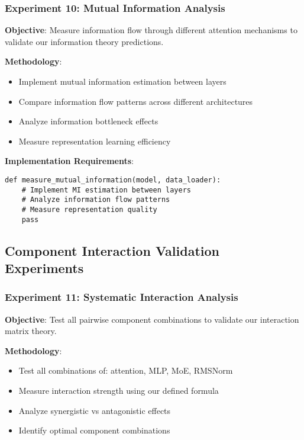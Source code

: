 \documentclass[11pt,a4paper]{article}
\begin{document}
\subsubsection{Experiment 10: Mutual Information Analysis}
\textbf{Objective}: Measure information flow through different attention mechanisms to validate our information theory predictions.

\textbf{Methodology}:
\begin{itemize}
    \item Implement mutual information estimation between layers
    \item Compare information flow patterns across different architectures
    \item Analyze information bottleneck effects
    \item Measure representation learning efficiency
\end{itemize}

\textbf{Implementation Requirements}:
\begin{verbatim}
def measure_mutual_information(model, data_loader):
    # Implement MI estimation between layers
    # Analyze information flow patterns
    # Measure representation quality
    pass
\end{verbatim}

\subsection{Component Interaction Validation Experiments}

\subsubsection{Experiment 11: Systematic Interaction Analysis}
\textbf{Objective}: Test all pairwise component combinations to validate our interaction matrix theory.

\textbf{Methodology}:
\begin{itemize}
    \item Test all combinations of: attention, MLP, MoE, RMSNorm
    \item Measure interaction strength using our defined formula
    \item Analyze synergistic vs antagonistic effects
    \item Identify optimal component combinations
\end{itemize}
\end{document}
